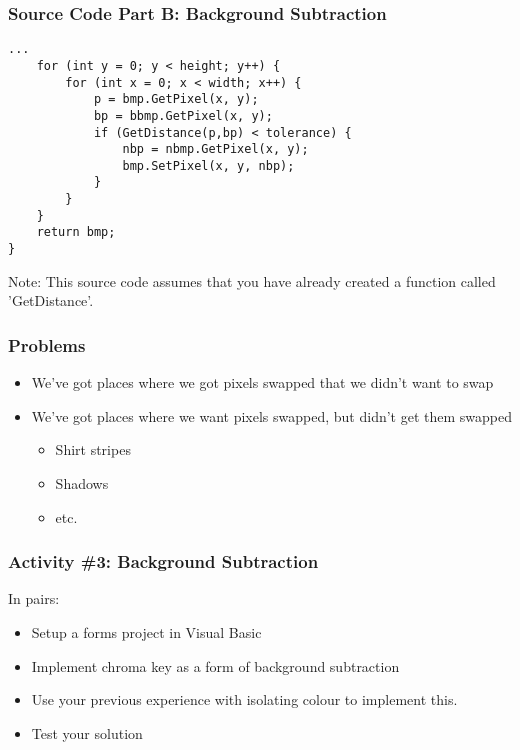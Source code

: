 \begin{frame}[fragile]
	\frametitle{Source Code Part B: Background Subtraction}
	
	\begin{lstlisting}
...		
	for (int y = 0; y < height; y++) {
		for (int x = 0; x < width; x++) {
			p = bmp.GetPixel(x, y);
			bp = bbmp.GetPixel(x, y);
			if (GetDistance(p,bp) < tolerance) {
				nbp = nbmp.GetPixel(x, y);
				bmp.SetPixel(x, y, nbp);
			}
		}
	}	
	return bmp;
}
	\end{lstlisting}
	
	Note: This source code assumes that you have already created a function called 'GetDistance'.
	
\end{frame}



\begin{frame}
	\frametitle{Problems}
	
	\begin{itemize}		
		\item We've got places where we got pixels swapped that we didn't want to swap
		\item We've got places where we want pixels swapped, but didn't get them swapped
		\begin{itemize}
			\item Shirt stripes
			\item Shadows
			\item etc.
		\end{itemize}	
	\end{itemize}
\end{frame}

\begin{frame}
	\frametitle{Activity \#3: Background Subtraction}
	
	In pairs:
	
	\vspace{2em}
	
	\begin{itemize}		
		\item Setup a forms project in Visual Basic
		\item Implement chroma key as a form of background subtraction
		\item Use your previous experience with isolating colour to implement this.
		\item Test your solution
	\end{itemize}
\end{frame}

